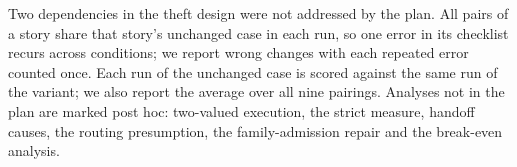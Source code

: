 Two dependencies in the theft design were not addressed by the plan. All pairs of a story share that story's unchanged case in each run, so one error in its checklist recurs across conditions; we report wrong changes with each repeated error counted once. Each run of the unchanged case is scored against the same run of the variant; we also report the average over all nine pairings. Analyses not in the plan are marked post hoc: two-valued execution, the strict measure, handoff causes, the routing presumption, the family-admission repair and the break-even analysis.
